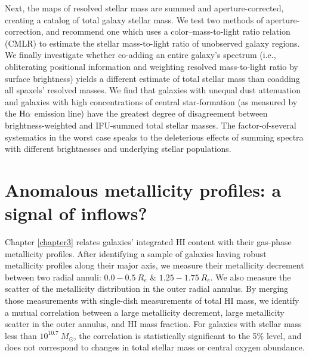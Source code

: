 Next, the maps of resolved stellar mass are summed and aperture-corrected, creating a catalog of total galaxy stellar mass. We test two methods of aperture-correction, and recommend one which uses a color--mass-to-light ratio relation (CMLR) to estimate the stellar mass-to-light ratio of unobserved galaxy regions. We finally investigate whether co-adding an entire galaxy's spectrum (i.e., obliterating positional information and weighting resolved mass-to-light ratio by surface brightness) yields a different estimate of total stellar mass than coadding all spaxels' resolved masses. We find that galaxies with unequal dust attenuation and galaxies with high concentrations of central star-formation (as measured by the $\rm H\alpha$ emission line) have the greatest degree of disagreement between brightness-weighted and IFU-summed total stellar masses. The factor-of-several systematics in the worst case speaks to the deleterious effects of summing spectra with different brightnesses and underlying stellar populations.

\section{Anomalous metallicity profiles: a signal of inflows?}

Chapter \ref{chapter3} relates galaxies' integrated HI content with their gas-phase metallicity profiles. After identifying a sample of galaxies having robust metallicity profiles along their major axis, we measure their metallicity decrement between two radial annuli: $0.0 - 0.5 ~ R_e$ \& $1.25 - 1.75 ~ R_e$. We also measure the scatter of the metallicity distribution in the outer radial annulus. By merging those measurements with single-dish measurements of total HI mass, we identify a mutual correlation between a large metallicity decrement, large metallicity scatter in the outer annulus, and HI mass fraction. For galaxies with stellar mass less than $10^{10.7} ~ M_{\odot}$, the correlation is statistically significant to the 5\% level, and does not correspond to changes in total stellar mass or central oxygen abundance. 

